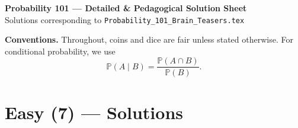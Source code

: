 \documentclass[11pt]{article}
\begin{document}
\begin{center}
{\LARGE \textbf{Probability 101 — Detailed \& Pedagogical Solution Sheet}}\\[0.2em]
{\small Solutions corresponding to \texttt{Probability\_101\_Brain\_Teasers.tex}}
\end{center}

\vspace{0.5em}
\noindent\textbf{Conventions.} Throughout, coins and dice are fair unless stated otherwise. For conditional probability, we use
\[
\mathbb{P}(A\mid B)=\frac{\mathbb{P}(A\cap B)}{\mathbb{P}(B)}.
\]

\section*{Easy (7) — Solutions}
\end{document}

